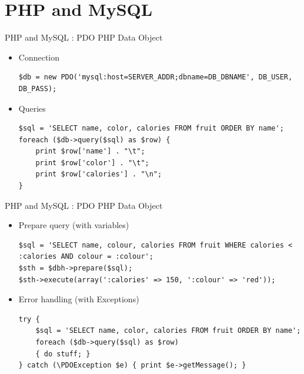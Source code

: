 \documentclass{beamer}
\begin{document}
\section{PHP and MySQL}

\begin{frame}[fragile]{PHP and MySQL : PDO}
    PHP Data Object
    
    \begin{itemize}
        \item Connection
            \begin{lstlisting}
$db = new PDO('mysql:host=SERVER_ADDR;dbname=DB_DBNAME', DB_USER, DB_PASS);
            \end{lstlisting}
        \item Queries
            \begin{lstlisting}
$sql = 'SELECT name, color, calories FROM fruit ORDER BY name';
foreach ($db->query($sql) as $row) {
    print $row['name'] . "\t";
    print $row['color'] . "\t";
    print $row['calories'] . "\n";
}
            \end{lstlisting}
    \end{itemize}
\end{frame}

\begin{frame}[fragile]{PHP and MySQL : PDO}
    PHP Data Object
    
    \begin{itemize}
        \item Prepare query (with variables)
            \begin{lstlisting}
$sql = 'SELECT name, colour, calories FROM fruit WHERE calories < :calories AND colour = :colour';
$sth = $dbh->prepare($sql);
$sth->execute(array(':calories' => 150, ':colour' => 'red'));
            \end{lstlisting}
        \pause
        \item Error handling (with Exceptions)
            \begin{lstlisting}
try {
    $sql = 'SELECT name, color, calories FROM fruit ORDER BY name';
    foreach ($db->query($sql) as $row)
    { do stuff; }
} catch (\PDOException $e) { print $e->getMessage(); }
            \end{lstlisting}
    \end{itemize}
\end{frame}
\end{document}
